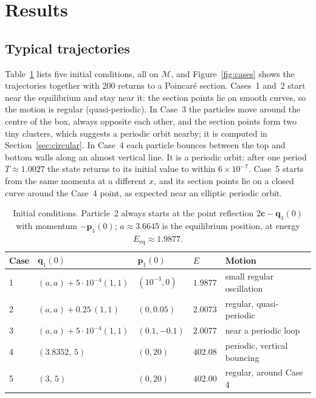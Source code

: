 \documentclass[11pt,a4paper]{article}
\newcommand{\q}{\mathbf{q}}
\newcommand{\p}{\mathbf{p}}
\newcommand{\M}{\mathcal{M}}
\begin{document}
\section{Results}\label{sec:results}

\subsection{Typical trajectories}\label{sec:trajectories}
Table~\ref{tab:cases} lists five initial conditions, all on $\M$, and
Figure~\ref{fig:cases} shows the trajectories together with 200 returns to a
Poincar\'e section. Cases~1 and~2 start near the equilibrium and stay near it:
the section points lie on smooth curves, so the motion is regular
(quasi-periodic). In Case~3 the particles move around the centre of the box,
always opposite each other, and the section points form two tiny clusters,
which suggests a periodic orbit nearby; it is computed in
Section~\ref{sec:circular}. In Case~4 each particle bounces between the top and
bottom walls along an almost vertical line. It is a periodic orbit: after one
period $T\approx1.0027$ the state returns to its initial value to within
$6\times10^{-7}$. Case~5 starts from the same momenta at a different $x$, and
its section points lie on a closed curve around the Case~4 point, as expected
near an elliptic periodic orbit.

\begin{table}[H]
\centering
\caption{Initial conditions. Particle~2 always starts at the point reflection
$2\mathbf{c}-\q_1(0)$ with momentum $-\p_1(0)$; $a\approx3.6645$ is the
equilibrium position, at energy $E_{\mathrm{eq}}\approx1.9877$.}
\label{tab:cases}
\begin{tabular}{@{}lllll@{}}
\toprule
Case & $\q_1(0)$ & $\p_1(0)$ & $E$ & Motion\\
\midrule
1 & $(a,a)+5\cdot10^{-4}(1,1)$ & $(10^{-3},0)$ & $1.9877$ & small regular oscillation\\
2 & $(a,a)+0.25\,(1,1)$ & $(0,0.05)$ & $2.0073$ & regular, quasi-periodic\\
3 & $(a,a)+5\cdot10^{-4}(1,1)$ & $(0.1,-0.1)$ & $2.0077$ & near a periodic loop\\
4 & $(3.8352,\,5)$ & $(0,20)$ & $402.08$ & periodic, vertical bouncing\\
5 & $(3,\,5)$ & $(0,20)$ & $402.00$ & regular, around Case 4\\
\bottomrule
\end{tabular}
\end{table}
\end{document}
